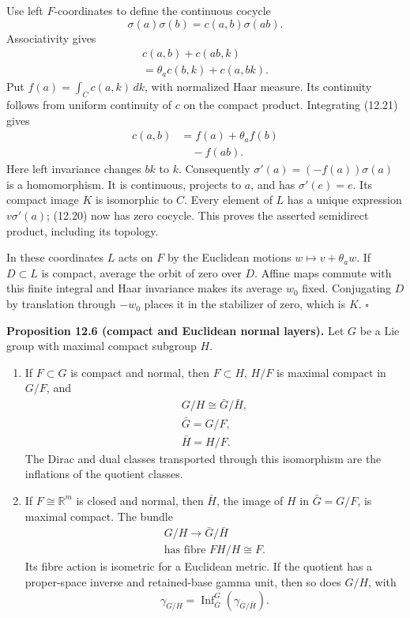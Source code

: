 \documentclass[
  11pt,
]{article}
\providecommand{\tightlist}{%
  \setlength{\itemsep}{0pt}\setlength{\parskip}{0pt}}
\begin{document}
Use left \(F\)-coordinates to define the continuous cocycle \[
\sigma(a)\sigma(b)=c(a,b)\sigma(ab).
\tag{12.20}
\] Associativity gives \[
\begin{gathered}
c(a,b)+c(ab,k)\\
=\theta_a c(b,k)+c(a,bk).
\end{gathered}
\tag{12.21}
\] Put \(f(a)=\int_C c(a,k)\,dk\), with normalized Haar measure. Its
continuity follows from uniform continuity of \(c\) on the compact
product. Integrating (12.21) gives \[
\begin{aligned}
c(a,b)&=f(a)+\theta_a f(b)\\
&\quad-f(ab).
\end{aligned}
\tag{12.22}
\] Here left invariance changes \(bk\) to \(k\). Consequently
\(\sigma'(a)=(-f(a))\sigma(a)\) is a homomorphism. It is continuous,
projects to \(a\), and has \(\sigma'(e)=e\). Its compact image \(K\) is
isomorphic to \(C\). Every element of \(L\) has a unique expression
\(v\sigma'(a)\); (12.20) now has zero cocycle. This proves the asserted
semidirect product, including its topology.

In these coordinates \(L\) acts on \(F\) by the Euclidean motions
\(w\mapsto v+\theta_a w\). If \(D\subset L\) is compact, average the
orbit of zero over \(D\). Affine maps commute with this finite integral
and Haar invariance makes its average \(w_0\) fixed. Conjugating \(D\)
by translation through \(-w_0\) places it in the stabilizer of zero,
which is \(K\). \(\square\)

\textbf{Proposition 12.6 (compact and Euclidean normal layers).} Let
\(G\) be a Lie group with maximal compact subgroup \(H\).

\begin{enumerate}
\def\labelenumi{\arabic{enumi}.}
\tightlist
\item
  If \(F\subset G\) is compact and normal, then \(F\subset H\), \(H/F\)
  is maximal compact in \(G/F\), and \[
  \begin{gathered}
  G/H\cong\bar G/\bar H,\\
  \bar G=G/F,\\
  \bar H=H/F.
  \end{gathered}
  \tag{12.23}
  \] The Dirac and dual classes transported through this isomorphism are
  the inflations of the quotient classes.
\item
  If \(F\cong\mathbb R^m\) is closed and normal, then \(\bar H\), the
  image of \(H\) in \(\bar G=G/F\), is maximal compact. The bundle \[
  \begin{gathered}
  G/H\longrightarrow\bar G/\bar H\\
  \text{has fibre }FH/H\cong F.
  \end{gathered}
  \tag{12.24}
  \] Its fibre action is isometric for a Euclidean metric. If the
  quotient has a proper-space inverse and retained-base gamma unit, then
  so does \(G/H\), with \[
  \gamma_{G/H}=\operatorname{Inf}_{\bar G}^G
  (\gamma_{\bar G/\bar H}).
  \tag{12.25}
  \]
\end{enumerate}
\end{document}
